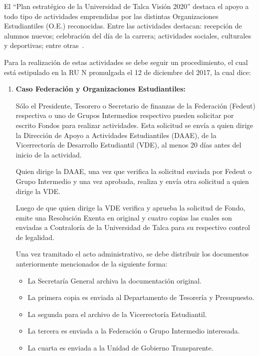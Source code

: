 El ``Plan estratégico de la Universidad de Talca Visión 2020'' destaca el apoyo a todo tipo de actividades emprendidas por las distintas Organizaciones Estudiantiles (O.E.) reconocidas. Entre las actividades destacan: recepción de alumnos nuevos; celebración del día de la carrera; actividades sociales, culturales y deportivas; entre otras~\cite{5}.

Para la realización de estas actividades se debe seguir un procedimiento, el cual está estipulado en la RU N promulgada el 12 de diciembre del 2017, la cual dice:

\begin{enumerate}[label=\textbf{\Alph*.}]
    \item \textbf{Caso Federación y Organizaciones Estudiantiles:}

    Sólo el Presidente, Tesorero o Secretario de finanzas de la Federación (Fedeut) respectiva o uno de Grupos Intermedios respectivo pueden solicitar por escrito Fondos para realizar actividades. Esta solicitud se envía a quien dirige la Dirección de Apoyo a Actividades Estudiantiles (DAAE), de la Vicerrectoría de Desarrollo Estudiantil (VDE), al menos 20 días antes del inicio de la actividad. 

    Quien dirige la DAAE, una vez que verifica la solicitud enviada por Fedeut o Grupo Intermedio y una vez aprobada, realiza y envía otra solicitud a quien dirige la VDE.

    Luego de que quien dirige la VDE verifica y aprueba la solicitud de Fondo, emite una Resolución Exenta en original y cuatro copias las cuales son enviadas a Contraloría de la Universidad de Talca para su respectivo control de legalidad. 
    
    Una vez tramitado el acto administrativo, se debe distribuir los documentos anteriormente mencionados de la siguiente forma: 

    \begin{itemize}
        \item La Secretaría General archiva la documentación original.
        \item La primera copia es enviada al Departamento de Tesorería y Presupuesto.
        \item La segunda para el archivo de la Vicerrectoría Estudiantil.
        \item La tercera es enviada a la Federación o Grupo Intermedio interesada.
        \item La cuarta es enviada a la Unidad de Gobierno Transparente.
    \end{itemize}


\end{enumerate}
